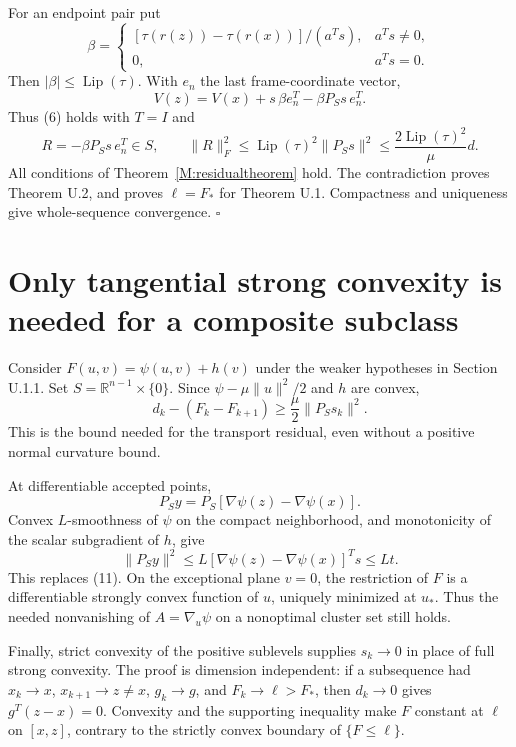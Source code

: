\documentclass[10pt,oneside,openany]{book}
\theoremstyle{remark}\newtheorem{remark}{Remark}[chapter]
\begin{document}
For an endpoint pair put \[
 \beta=\begin{cases}
 [\tau(r(z))-\tau(r(x))]/(a^Ts),&a^Ts\ne0,\\
 0,&a^Ts=0.
 \end{cases}
\] Then \(|\beta|\le\operatorname{Lip}(\tau)\). With \(e_n\) the last
frame-coordinate vector, \[
 \boxed{
 V(z)=V(x)+s\,\beta e_n^T-\beta P_Ss\,e_n^T.
 }\tag{U.14}
\] Thus (6) holds with \(T=I\) and \[
 R=-\beta P_Ss\,e_n^T\in S,
 \qquad
 \|R\|_F^2\le\operatorname{Lip}(\tau)^2\|P_Ss\|^2
 \le\frac{2\operatorname{Lip}(\tau)^2}{\mu}d.\tag{U.15}
\] All conditions of Theorem~\ref{M:residualtheorem} hold. The contradiction proves Theorem U.2,
and proves \(\ell=F_*\) for Theorem U.1. Compactness and uniqueness give
whole-sequence convergence. \(\square\)


\setcounter{section}{5}
\setcounter{theorem}{0}
\setcounter{lemma}{0}
\setcounter{corollary}{0}
\setcounter{proposition}{0}
\setcounter{remark}{0}
\setcounter{equation}{0}
\section{Only tangential strong convexity is needed for a composite
subclass}\label{U:only-tangential-strong-convexity-is-needed-for-a-composite-subclass}

Consider \(F(u,v)=\psi(u,v)+h(v)\) under the weaker hypotheses in
Section U.1.1. Set \(S=\mathbb R^{n-1}\times\{0\}\). Since
\(\psi-\mu\|u\|^2/2\) and \(h\) are convex, \[
 d_k-(F_k-F_{k+1})\ge\frac\mu2\|P_Ss_k\|^2.\tag{U.16}
\] This is the bound needed for the transport residual, even without a
positive normal curvature bound.

At differentiable accepted points, \[
 P_Sy=P_S[\nabla\psi(z)-\nabla\psi(x)].
\] Convex \(L\)-smoothness of \(\psi\) on the compact neighborhood, and
monotonicity of the scalar subgradient of \(h\), give \[
 \|P_Sy\|^2
 \le L[\nabla\psi(z)-\nabla\psi(x)]^Ts
 \le Lt.\tag{U.17}
\] This replaces (11). On the exceptional plane \(v=0\), the restriction
of \(F\) is a differentiable strongly convex function of \(u\), uniquely
minimized at \(u_*\). Thus the needed nonvanishing of \(A=\nabla_u\psi\)
on a nonoptimal cluster set still holds.

Finally, strict convexity of the positive sublevels supplies \(s_k\to0\)
in place of full strong convexity. The proof is dimension independent:
if a subsequence had \(x_k\to x\), \(x_{k+1}\to z\ne x\), \(g_k\to g\),
and \(F_k\to\ell>F_*\), then \(d_k\to0\) gives \(g^T(z-x)=0\). Convexity
and the supporting inequality make \(F\) constant at \(\ell\) on
\([x,z]\), contrary to the strictly convex boundary of \(\{F\le\ell\}\).
\end{document}
